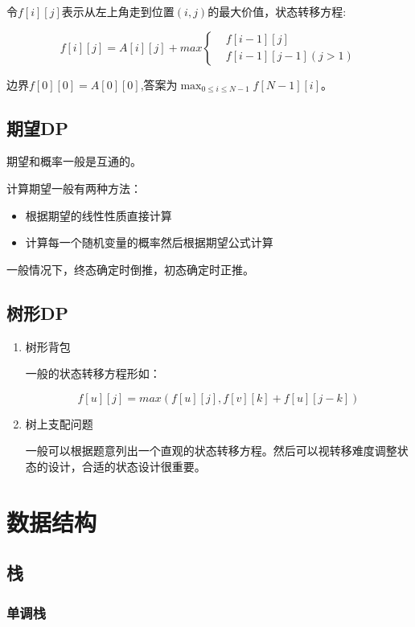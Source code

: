 \documentclass[11pt]{article}
\begin{document}
令\(f[i][j]\)表示从左上角走到位置\((i,j)\)的最大价值，状态转移方程:

$$
f[i][j]=A[i][j]+max\left\{\begin{aligned}
&f[i-1][j]\\
&f[i-1][j-1] (j>1)
\end{aligned}\right.
$$

边界\(f[0][0]=A[0][0]\),答案为\(\max_{0 \leq i \leq N-1} f[N-1][i]\)。

\subsection{期望DP}
\label{sec-5-4}

期望和概率一般是互通的。

计算期望一般有两种方法：

\begin{itemize}
\item 根据期望的线性性质直接计算
\item 计算每一个随机变量的概率然后根据期望公式计算
\end{itemize}

一般情况下，终态确定时倒推，初态确定时正推。

\subsection{树形DP}
\label{sec-5-5}
\begin{enumerate}
\item 树形背包
\label{sec-5-5-0-1}

一般的状态转移方程形如：

$$
f[u][j] = max(f[u][j], f[v][k] + f[u][j - k])
$$

\item 树上支配问题
\label{sec-5-5-0-2}

一般可以根据题意列出一个直观的状态转移方程。然后可以视转移难度调整状态的设计，合适的状态设计很重要。
\end{enumerate}

\section{数据结构}
\label{sec-6}
\subsection{栈}
\label{sec-6-1}
\subsubsection{单调栈}
\label{sec-6-1-1}
\end{document}

